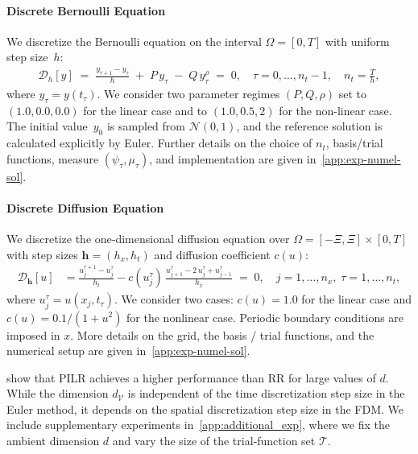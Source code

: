 \documentclass{article}
\theoremstyle{plain}
\theoremstyle{definition}
\theoremstyle{remark}
\begin{document}
\paragraph{Discrete Bernoulli Equation}
We discretize the Bernoulli equation on the interval $\Omega=[0,T]$ with uniform step size~$h$:
\begin{align*}
  \mathscr{D}_h[y]
  \;=\;\frac{y_{\tau+1}-y_{\tau}}{h} \;+\; P\,y_{\tau}\;-\;Q\,y_{\tau}^{\rho}
  \;=\;0, 
  \quad \tau=0,\dots,n_t-1,\quad n_t=\frac{T}{h},
\end{align*}
where \( y_{\tau} = y(t_{\tau}) \). We consider two parameter regimes \( (P, Q, \rho) \) set to \((1.0, 0.0, 0.0)\) for the linear case and to \((1.0, 0.5, 2)\) for the non-linear case.
The initial value~$y_0$ is sampled from $\mathcal{N}(0,1)$, and the reference solution is calculated explicitly by Euler.  
Further details on the choice of $n_t$, basis/trial functions, measure $(\psi_\tau,\mu_\tau)$, and implementation are given in~\cref{app:exp-numel-sol}. 

\paragraph{Discrete Diffusion Equation}
We discretize the one‐dimensional diffusion equation over 
\(\Omega=[-\Xi,\Xi]\times[0,T]\) with step sizes \(\bm h=(h_x,h_t)\) and diffusion coefficient \(c(u)\):
\begin{align*}
  \mathscr{D}_{\bm h}[u]
  &= \frac{u_j^{\tau+1}-u_j^{\tau}}{h_t}
     -c(u_j^{\tau})\,\frac{u_{j+1}^{\tau}-2\,u_{j}^{\tau}+u_{j-1}^{\tau}}{h_x}
  \;=\;0,
  \quad j = 1, \dots, n_x,\;\tau = 1, \dots, n_t,
\end{align*}
where \(u_j^{\tau}=u(x_j,t_{\tau})\).  
We consider two cases:  \( c(u) = 1.0 \) for the linear case and \( c(u) = 0.1/(1 + u^2) \) for the nonlinear case.
Periodic boundary conditions are imposed in \(x\).  
More details on the grid, the basis / trial functions, and the numerical setup are given in~\cref{app:exp-numel-sol}. 

 show that PILR achieves a higher performance than RR for large values of \(d\). While the dimension \(d_{\mathcal{V}}\) is independent of the time discretization step size in the Euler method, it depends on the spatial discretization step size in the FDM. We include supplementary experiments in~\cref{app:additional_exp}, where we fix the ambient dimension \(d\) and vary the size of the trial‐function set \(\mathcal{T}\). 
\end{document}
